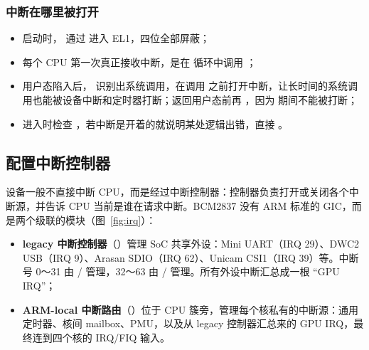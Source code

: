 \subsubsection{中断在哪里被打开}


\begin{itemize}
  \item 启动时， 通过  进入 EL1，四位全部屏蔽；
  \item 每个 CPU 第一次真正接收中断，是在  循环中调用 ；
  \item 用户态陷入后， 识别出系统调用，在调用  之前打开中断，让长时间的系统调用也能被设备中断和定时器打断；返回用户态前再 ，因为  期间不能被打断；
  \item {} 进入时检查 ，若中断是开着的就说明某处逻辑出错，直接 。
\end{itemize}

\subsection{配置中断控制器}

设备一般不直接中断 CPU，而是经过中断控制器：控制器负责打开或关闭各个中断源，并告诉 CPU 当前是谁在请求中断。BCM2837 没有 ARM 标准的 GIC，而是两个级联的模块（图~\ref{fig:irq}）：

\begin{itemize}
  \item \textbf{legacy 中断控制器}（）管理 SoC 共享外设：Mini UART（IRQ 29）、DWC2 USB（IRQ 9）、Arasan SDIO（IRQ 62）、Unicam CSI1（IRQ 39）等。中断号 0～31 由 / 管理，32～63 由 / 管理。所有外设中断汇总成一根 “GPU IRQ”；
  \item \textbf{ARM-local 中断路由}（）位于 CPU 簇旁，管理每个核私有的中断源：通用定时器、核间 mailbox、PMU，以及从 legacy 控制器汇总来的 GPU IRQ，最终连到四个核的 IRQ/FIQ 输入。
\end{itemize}

